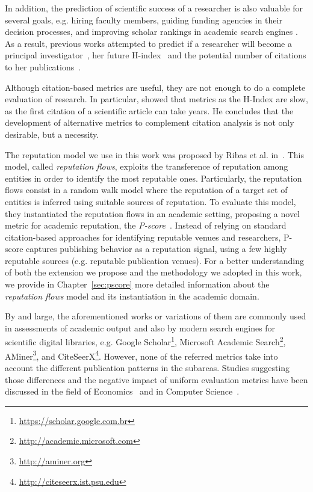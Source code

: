 \documentclass[msc]{ppgccufmg}
\begin{document}
In addition, the prediction of scientific success of a researcher is also valuable for several goals, e.g. hiring faculty members, guiding funding agencies in their decision processes, and improving scholar rankings in academic search engines \citep{masoumeh16}. As a result, previous works attempted to predict if a researcher will become a principal investigator~\citep{vandijk14}, her future H-index~\citep{dong15, penner13} and the potential number of citations to her publications~\citep{mazloumian12, castillo2007estimating}.

Although citation-based metrics are useful, they are not enough to do a complete evaluation of research.  In particular, \cite{piwowar2013altmetrics} showed that metrics as the H-Index are slow, as the first citation of a scientific article can take years. He concludes that the development of alternative metrics to complement citation analysis is not only desirable, but a necessity. 

The reputation model we use in this work was proposed by Ribas et al. in~\citep{ribas2015random}. This model, called \textit{reputation flows}, exploits the transference of reputation among entities in order to identify the most reputable ones. Particularly, the reputation flows consist in a random walk model where the reputation of a target set of entities is inferred using suitable sources of reputation. To evaluate this model, they instantiated the reputation flows in an academic setting, proposing a novel metric for academic reputation, the \textit{P-score}~\citep{ribas2015bigscholar}. Instead of relying on standard citation-based approaches for identifying reputable venues and researchers, P-score captures publishing behavior as a reputation signal, using a few highly reputable sources (e.g. reputable publication venues). For a better understanding of both the extension we propose and the methodology we adopted in this work, we provide in Chapter~\ref{sec:pscore} more detailed information about the \textit{reputation flows} model and its instantiation in the academic domain. 

By and large, the aforementioned works or variations of them are commonly used in assessments of academic output and also by modern search engines for scientific digital libraries, e.g. Google Scholar\footnote{\url{https://scholar.google.com.br}}, Microsoft Academic Search\footnote{\url{http://academic.microsoft.com}}, AMiner\footnote{\url{http://aminer.org}}, %
and CiteSeerX\footnote{\url{http://citeseerx.ist.psu.edu}}.  
However, none of the referred metrics take into account the different publication patterns in the subareas. Studies suggesting those differences and the negative impact of uniform evaluation metrics have been discussed in the field of Economics~\citep{kapeller10, lee10} and in Computer Science~\citep{hoonlor13, laendersigs15, lima2013jcdl}.
\end{document}
